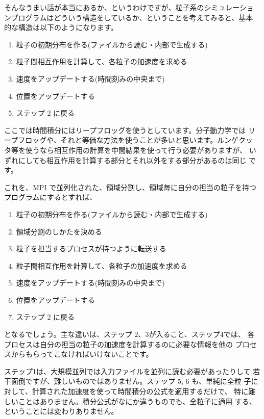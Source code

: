 \documentclass[twocolumn,10pt]{jarticle}
\begin{document}
そんなうまい話が本当にあるか、というわけですが、粒子系のシミュレーショ
ンプログラムはどういう構造をしているか、ということを考えてみると、基本
的な構造は以下のようになります。

\begin{enumerate}

\item 粒子の初期分布を作る(ファイルから読む・内部で生成する)
\item 粒子間相互作用を計算して、各粒子の加速度を求める
\item 速度をアップデートする(時間刻みの中央まで)
\item 位置をアップデートする  
\item ステップ 2 に戻る
\end{enumerate}  

ここでは時間積分にはリープフロッグを使うとしています。分子動力学では
リープフロッグや、それと等価な方法を使うことが多いと思います。ルンゲクッ
タ等を使うなら相互作用の計算を中間結果を使って行う必要がありますが、
いずれにしても相互作用を計算する部分とそれ以外をする部分があるのは同じ
です。


これを、MPI で並列化された、領域分割し、領域毎に自分の担当の粒子を持つ
プログラムにするとすれば、

\begin{enumerate}

\item 粒子の初期分布を作る(ファイルから読む・内部で生成する)
\item 領域分割のしかたを決める
\item 粒子を担当するプロセスが持つように転送する
\item 粒子間相互作用を計算して、各粒子の加速度を求める
\item 速度をアップデートする(時間刻みの中央まで)
\item 位置をアップデートする  
\item ステップ 2 に戻る
\end{enumerate}

となるでしょう。主な違いは、ステップ 2、3が入ること、ステップ4では、
各プロセスは自分の担当の粒子の加速度を計算するのに必要な情報を他の
プロセスからもらってこなければいけないことです。


ステップ1は、大規模並列では入力ファイルを並列に読む必要があったりして
若干面倒ですが、難しいものではありません。ステップ 5, 6 も、単純に全粒
子に対して、計算された加速度を使って時間積分の公式を適用するだけで、
特に難しいことはありません。積分公式がなにか違うものでも、全粒子に適用
する、ということには変わりありません。
\end{document}
